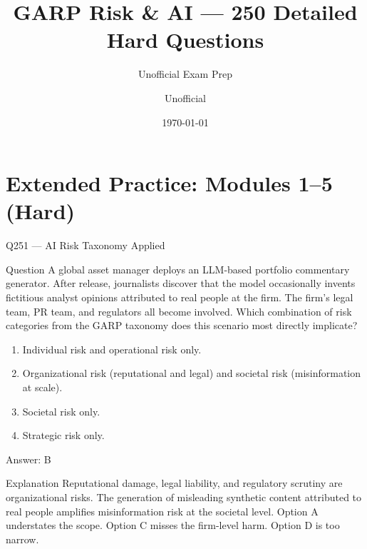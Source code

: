 \documentclass[aspectratio=169,8pt]{beamer}
\title[GARP RAI]{GARP Risk \& AI --- 250 Detailed Hard Questions}
\subtitle{Unofficial Exam Prep}
\author{Unofficial}
\date{\today}
\begin{document}
\section{Extended Practice: Modules 1--5 (Hard)}


\begin{frame}{Q251 --- AI Risk Taxonomy Applied}
\begin{block}{Question}
A global asset manager deploys an LLM-based portfolio commentary generator. After release, journalists discover that the model occasionally invents fictitious analyst opinions attributed to real people at the firm. The firm's legal team, PR team, and regulators all become involved. Which combination of risk categories from the GARP taxonomy does this scenario most directly implicate?
\end{block}
\begin{enumerate}
\item Individual risk and operational risk only.
\item Organizational risk (reputational and legal) and societal risk (misinformation at scale).
\item Societal risk only.
\item Strategic risk only.
\end{enumerate}
\begin{exampleblock}{Answer: B}\end{exampleblock}
\begin{block}{Explanation}
Reputational damage, legal liability, and regulatory scrutiny are organizational risks. The generation of misleading synthetic content attributed to real people amplifies misinformation risk at the societal level. Option A understates the scope. Option C misses the firm-level harm. Option D is too narrow.
\end{block}
\end{frame}
\end{document}
